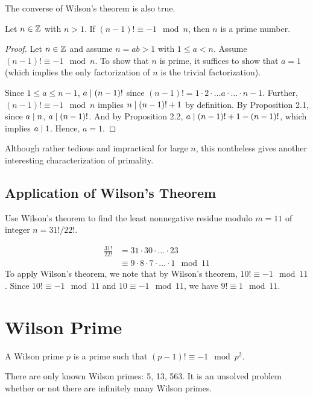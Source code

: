 The converse of Wilson's theorem is also true.

\begin{proposition}
    Let $n \in \mathbb{Z}$ with $n > 1$. If $(n-1)! \equiv -1 \mod n$, then $n$ is a prime number.
\end{proposition}

\begin{proof}
    Let $n \in \mathbb{Z}$ and assume $n = ab > 1$ with $1 \leq a < n$. Assume $(n-1)! \equiv -1 \mod n$. To show that $n$ is prime, it suffices to show that $a = 1$ (which implies the only factorization of $n$ is the trivial factorization).

    Since $1 \leq a \leq n-1$, $a \mathrel{\mid} (n-1)!$ since $(n-1)! = 1\cdot 2 \cdot \ldots a \cdot \ldots \cdot n-1$. Further, $(n-1)! \equiv -1 \mod n$ implies $n \mathrel{\mid} (n-1)! + 1$ by definition. By Proposition 2.1, since $a \mathrel{\mid} n$, $a \mathrel{\mid} (n-1)!$. And by Proposition 2.2, $a \mathrel{\mid} (n-1)! + 1 - (n-1)!$, which implies $a \mathrel{\mid} 1$. Hence, $a = 1$.
\end{proof}

Although rather tedious and impractical for large $n$, this nontheless gives another interesting characterization of primality.

\subsection{Application of Wilson's Theorem}

\begin{example}
    Use Wilson's theorem to find the least nonnegative residue modulo $m=11$ of integer $n = 31!/22!$.
\end{example}

$$
\begin{aligned}
    \frac{31!}{22!} &= 31 \cdot 30 \cdot \ldots \cdot 23 \\
    &\equiv 9 \cdot 8 \cdot 7 \cdot \ldots \cdot 1 \mod 11
\end{aligned}
$$
To apply Wilson's theorem, we note that by Wilson's theorem, $10! \equiv -1 \mod 11$. Since $10! \equiv -1 \mod 11$ and $10 \equiv -1 \mod 11$, we have $9! \equiv 1 \mod 11$.

\section{Wilson Prime}

\begin{definition}
    A Wilson prime $p$ is a prime such that $(p-1)! \equiv -1 \mod p^2$.
\end{definition}

There are only known Wilson primes: 5, 13, 563. It is an unsolved problem whether or not there are infinitely many Wilson primes.